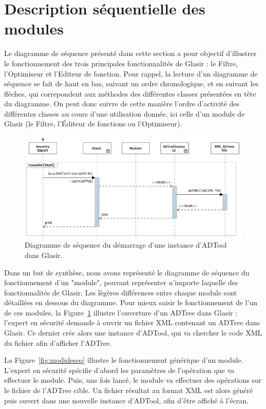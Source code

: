 \section{Description séquentielle des modules}
    \label{sec:modules}
    
Le diagramme de séquence présenté dans cette section a pour objectif d'illustrer le fonctionnement des trois principales fonctionnalités de Glasir : le Filtre, l'Optimiseur et l'Editeur de fonction. Pour rappel, la lecture d'un diagramme de séquence se fait de haut en bas, suivant un ordre chronologique, et en suivant les flèches, qui correpondent aux méthodes des différentes classes présentées en tête du diagramme. On peut donc suivre de cette manière l'ordre d'activité des différentes classes au cours d'une utilisation donnée, ici celle d'un module de Glasir (le Filtre, l'Éditeur de fonctions ou l'Optimiseur).

	    \begin{figure}[H]
	        \centering
	        \includegraphics[height=0.45\textwidth]{figure/startseqdiag.png}
	        \caption{Diagramme de séquence du démarrage d'une instance d'ADTool dans Glasir.}
	        \label{fig:start}
	    \end{figure}

Dans un but de synthèse, nous avons représenté le diagramme de séquence du fonctionnement d'un "module", pouvant représenter n'importe laquelle des fonctionnalités de Glasir. Les lègères différences entre chaque module sont détaillées en dessous du diagramme. Pour mieux saisir le fonctionnement de l'un de ces modules, la {\sc Figure}~{\ref{fig:start}} illustre l'ouverture d'un ADTree dans Glasir : l'expert en sécurité demande à ouvrir un fichier XML contenant un ADTree dans Glasir. Ce dernier crée alors une instance d'ADTool, qui va chercher le code XML du fichier afin d'afficher l'ADTree.

	    La {\sc Figure}~{\ref{fig:moduleseq}} illustre le fonctionnement générique d'un module. L'expert en sécurité spécifie d'abord les paramètres de l'opération que va effectuer le module. Puis, une fois lancé, le module va effectuer des opérations sur le fichier de l'ADTree cible. Un fichier résultat au format XML est alors généré puis ouvert dans une nouvelle instance d'ADTool, afin d'être affiché à l'écran. 


